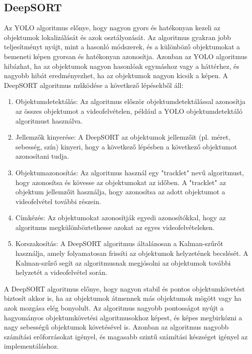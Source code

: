 \documentclass[acmtog, authorversion]{acmart}
\begin{document}
\subsection{DeepSORT}
Az YOLO algoritmus előnye, hogy nagyon gyors és hatékonyan kezeli az objektumok lokalizálását és azok osztályozását. Az algoritmus gyakran jobb teljesítményt nyújt, mint a hasonló módszerek, és a különböző objektumokat a bemeneti képen gyorsan és hatékonyan azonosítja. Azonban az YOLO algoritmus hibázhat, ha az objektumok nagyon hasonlóak egymáshoz vagy a háttérhez, és nagyobb hibát eredményezhet, ha az objektumok nagyon kicsik a képen.
A DeepSORT algoritmus működése a következő lépésekből áll:
\begin{enumerate}
    \item Objektumdetektálás: Az algoritmus először objektumdetektálással azonosítja az összes objektumot a videofelvételen, például a YOLO objektumdetektáló algoritmust használva.
    \item Jellemzők kinyerése: A DeepSORT az objektumok jellemzőit (pl. méret, sebesség, szín) kinyeri, hogy a következő lépésben a következő objektumot azonosítani tudja.
    \item Objektumazonosítás: Az algoritmus használ egy "tracklet" nevű algoritmust, hogy azonosítsa és kövesse az objektumokat az időben. A "tracklet" az objektum jellemzőit használja, hogy azonosítsa az adott objektumot a videofelvétel további részein.
    \item Címkézés: Az objektumokat azonosítják egyedi azonosítókkal, hogy az algoritmus megkülönböztethesse azokat az egyes videofelvételeken.
    \item Korszakosítás: A DeepSORT algoritmus általánosan a Kalman-szűrőt használja, amely folyamatosan frissíti az objektumok helyzetének becslését. A Kalman-szűrő segít az algoritmusnak megjósolni az objektumok további helyzetét a videofelvétel során.
\end{enumerate}
A DeepSORT algoritmus előnye, hogy nagyon stabil és pontos objektumkövetést biztosít akkor is, ha az objektumok átmennek más objektumok mögött vagy ha azok mozgása elég bonyolult. Az algoritmus nagyobb pontosságot nyújt a hagyományos objektumkövetési algoritmusokhoz képest, és képes megbirkózni a nagy sebességű objektumok követésével is. Azonban az algoritmus nagyobb számítási erőforrásokat igényel, és magasabb szintű számítási készséget igényel az implementáláshoz.
\end{document}
